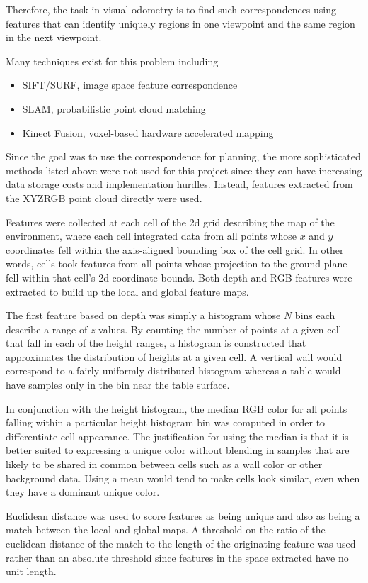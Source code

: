 \documentclass[letterpaper]{article}%
\begin{document}
Therefore, the task in visual odometry is to find such correspondences using
features that can identify uniquely regions in one viewpoint and the same
region in the next viewpoint.

Many techniques exist for this problem including
\begin{itemize}
  \item SIFT/SURF, image space feature correspondence
  \item SLAM, probabilistic point cloud matching
  \item Kinect Fusion, voxel-based hardware accelerated mapping
\end{itemize}

Since the goal was to use the correspondence for planning, the more
sophisticated methods listed above were not used for this project since they
can have increasing data storage costs and implementation hurdles. Instead,
features extracted from the XYZRGB point cloud directly were used.

Features were collected at each cell of the 2d grid describing the map of
the environment, where each cell integrated data from all points whose $x$ and
$y$ coordinates fell within the axis-aligned bounding box of the cell grid. In
other words, cells took features from all points whose projection to the ground
plane fell within that cell's 2d coordinate bounds. Both depth and RGB features
were extracted to build up the local and global feature maps.

The first feature based on depth was simply a histogram whose $N$ bins each
describe a range of $z$ values. By counting the number of points at a given
cell that fall in each of the height ranges, a histogram is constructed that
approximates the distribution of heights at a given cell. A vertical wall would
correspond to a fairly uniformly distributed histogram whereas a table would
have samples only in the bin near the table surface.

In conjunction with the height histogram, the median RGB color for all points
falling within a particular height histogram bin was computed in order to
differentiate cell appearance. The justification for using the median is that
it is better suited to expressing a unique color without blending in samples
that are likely to be shared in common between cells such as a wall color or
other background data. Using a mean would tend to make cells look similar, even
when they have a dominant unique color.

Euclidean distance was used to score features as being unique and also as being
a match between the local and global maps. A threshold on the ratio of the
euclidean distance of the match to the length of the originating feature was
used rather than an absolute threshold since features in the space extracted
have no unit length.
\end{document}

